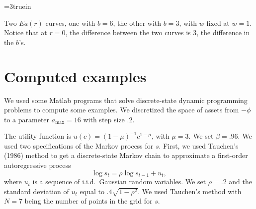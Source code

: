
\centerline{\epsfxsize=3truein}
\caption{Two $Ea(r)$ curves, one with $b=6$, the other with $b=3$, with $w$ fixed
at $w=1$. Notice that at $r=0$, the difference between the two curves is $3$, the
difference in the $b$'s.}
\endfigure

\section{Computed examples}

  We used some Matlab programs that solve
 discrete-state dynamic programming problems to compute some
examples.
We discretized the space  of assets from $-\phi$ to
a parameter $a_{\max} =16$ with step size $.2$.

 The utility function is $u(c) =(1- \mu)^{-1} c^{1-\mu}$, with $\mu =3$.
We set $\beta=.96$. We used two specifications of the Markov
process for $s$.  First, we used Tauchen's (1986) method to
get a discrete-state Markov chain to approximate a first-order
autoregressive process
$$ \log s_t =  \rho \log s_{t-1} + u_t, $$
where $u_t$ is a sequence of  i.i.d.\ Gaussian  random variables.
We set $\rho =.2$ and the standard deviation of $u_t$ equal
to $.4 \sqrt{1-\rho^2}$.  We used Tauchen's method with
$N=7$ being the number of points in the grid for $s$.

